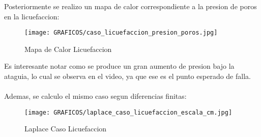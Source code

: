 Posteriormente se realizo un mapa de calor correspondiente a la presion de poros en la licuefaccion:

\begin{figure}[H]
    \centering
    \texttt{[image: GRAFICOS/caso\_licuefaccion\_presion\_poros.jpg]}
    \caption{Mapa de Calor Licuefaccion}
    \label{fig:maqueta_licuefaccion}
\end{figure}

Es interesante notar como se produce un gran aumento de presion bajo la ataguia, lo cual se observa en el video, ya que ese es el punto esperado de falla.
\\ \\
Ademas, se calculo el mismo caso segun diferencias finitas:

\begin{figure}[H]
    \centering
    \texttt{[image: GRAFICOS/laplace\_caso\_licuefaccion\_escala\_cm.jpg]}
    \caption{Laplace Caso Licuefaccion}
    \label{fig:maqueta_licuefaccion_diferencias_finitas}
\end{figure}
